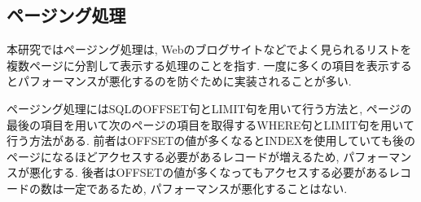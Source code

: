 \documentclass[../../../main]{subfiles}
\begin{document}
    \subsection{ページング処理}\label{subsec:phraseology-paging_pagination}

    本研究ではページング処理は, Webのブログサイトなどでよく見られるリストを複数ページに分割して表示する処理のことを指す. 一度に多くの項目を表示するとパフォーマンスが悪化するのを防ぐために実装されることが多い.

    ページング処理にはSQLのOFFSET句とLIMIT句を用いて行う方法と, ページの最後の項目を用いて次のページの項目を取得するWHERE句とLIMIT句を用いて行う方法がある. 前者はOFFSETの値が多くなるとINDEXを使用していても後のページになるほどアクセスする必要があるレコードが増えるため, パフォーマンスが悪化する. 後者はOFFSETの値が多くなってもアクセスする必要があるレコードの数は一定であるため, パフォーマンスが悪化することはない.
\end{document}
